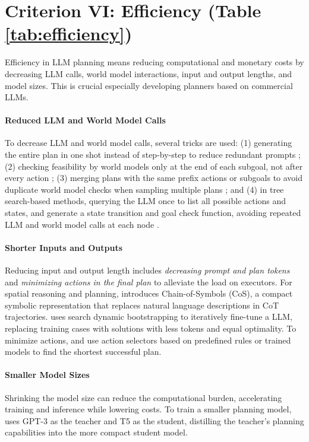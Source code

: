 \section{Criterion VI: Efficiency (Table \ref{tab:efficiency})} 
\label{sec:efficiency}

Efficiency in LLM planning means reducing computational and monetary costs by decreasing LLM calls, world model interactions, input and output lengths, and model sizes. This is crucial especially developing planners based on commercial LLMs.

\vspace{-0.08in}
 \paragraph{Reduced LLM and World Model Calls} To decrease LLM and world model calls, several tricks are used: (1) generating the entire plan in one shot instead of step-by-step to reduce redundant prompts \cite{hu2023tree, sun2024adaplanner, gonzalez2024query}; (2) checking feasibility by world models only at the end of each subgoal, not after every action \citep{sun2024adaplanner, gonzalez2024query}; (3) merging plans with the same prefix actions or subgoals to avoid duplicate world model checks when sampling multiple plans \citep{hu2023tree}; and (4) in tree search-based methods, querying the LLM once to list all possible actions and states, and generate a state transition and goal check function, avoiding repeated LLM and world model calls at each node \citep{katz2024thought}.  

\vspace{-0.05in}
\paragraph{Shorter Inputs and Outputs} Reducing input and output length includes \emph{decreasing prompt and plan tokens} and \emph{minimizing actions in the final plan} to alleviate the load on executors. For spatial reasoning and planning, \citep{hu2024chain} introduces Chain-of-Symbols (CoS), a compact symbolic representation that replaces natural language descriptions in CoT \cite{wei2022chain} trajectories. \citet{lehnert2024beyond} uses search dynamic bootstrapping to iteratively fine-tune a LLM, replacing training cases with solutions with less tokens and equal optimality. To minimize actions, \citet{dagan2023dynamic} and \citet{wang2023describe} use action selectors based on predefined rules or trained models to find the shortest successful plan.     

\vspace{-0.05in}
\paragraph{Smaller Model Sizes} Shrinking the model size can reduce the computational burden, accelerating training and inference while lowering costs. To train a smaller planning model, \citet{brahmanplasma} uses GPT-3 \cite{brown2020language} as the teacher and T5 \cite{raffel2020exploring} as the student, distilling the teacher's planning capabilities into the more compact student model.
